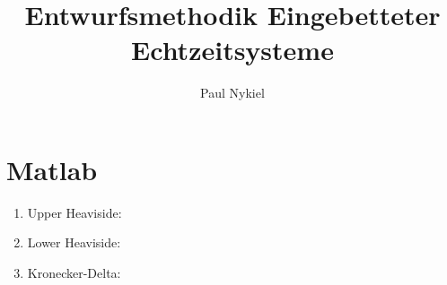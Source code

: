 \documentclass[DIN, pagenumber=false, fontsize=11pt, parskip=half]{scrartcl}
\title{Entwurfsmethodik Eingebetteter Echtzeitsysteme}
\author{Paul Nykiel}
\begin{document}
    \maketitle
    \section{Matlab}
    \begin{enumerate}[label=\alph*)]
        \item Upper Heaviside:
            
        \item Lower Heaviside:
            
        \item Kronecker-Delta:
            
    \end{enumerate}
\end{document}
